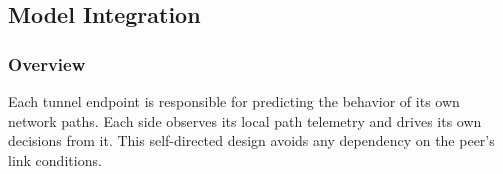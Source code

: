 \documentclass[sigconf,nonacm]{acmart}
\begin{document}


%     

\subsection{Model Integration}
\label{subsec:model_integration}

\subsubsection{Overview}

Each tunnel endpoint is responsible for predicting the behavior of its own network paths. Each side observes its local path telemetry and drives its own decisions from it. This self-directed design avoids any dependency on the peer's link conditions.
\end{document}
